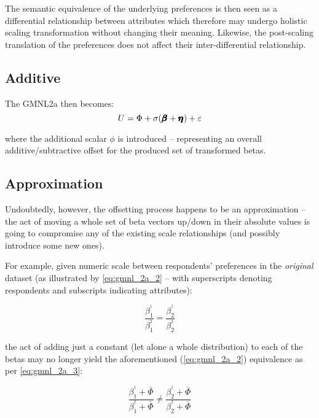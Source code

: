 \documentclass[12pt,a4paper]{article}
\begin{document}
The semantic equivalence of the underlying preferences is then seen as a differential relationship between attributes which therefore may undergo holistic scaling transformation without changing their meaning. Likewise, the post-scaling translation of the preferences does not affect their inter-differential relationship.

\subsection{Additive}

The GMNL2a then becomes:
{ \Large 
\begin{equation}
\label{eq:gmnl_2a_1}
U=\Phi + \sigma(\pmb{\hm{\beta}}+\pmb{\hm{\eta}}) + \varepsilon
\end{equation}
}

where the additional scalar \(\phi\) is introduced -- representing an overall additive/subtractive offset for the produced set of transformed betas. 

\subsection{Approximation}

Undoubtedly, however, the offsetting process happens to be an approximation -- the act of moving a whole set of beta vectors up/down in their absolute values is going to compromise any of the existing scale relationships (and possibly introduce some new ones).

For example, given numeric scale between respondents' preferences in the \textit{original} dataset (as illustrated by \autoref{eq:gmnl_2a_2} -- with superscripts denoting respondents and subscripts indicating attributes):

{ \Large 
\begin{equation}
\label{eq:gmnl_2a_2}
\frac{\beta^{^1}_{1}}{\beta^{^2}_{1}}=\frac{\beta^{^1}_{2}}{\beta^{^2}_{2}}
\end{equation}
}

the act of adding just a constant (let alone a whole distribution) to each of the betas may no longer yield the aforementioned (\autoref{eq:gmnl_2a_2}) equivalence as per \autoref{eq:gmnl_2a_3}:

{ \Large 
\begin{equation}
\label{eq:gmnl_2a_3}
\frac{\beta^{^1}_{1} + \bar{\Phi}}{\beta^{^2}_{1} + \bar{\Phi}} \neq \frac{\beta^{^1}_{2} + \bar{\Phi}}{\beta^{^2}_{2} + \bar{\Phi}}
\end{equation}
}
\end{document}
